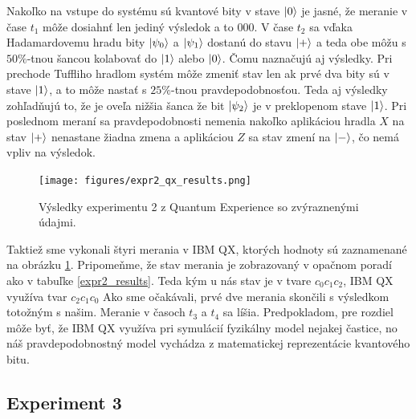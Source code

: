 Nakoľko na vstupe do systému sú kvantové bity v stave \(\ket{0}\) je jasné, že
meranie v čase \(t_1\) môže dosiahnť len jediný výsledok a to  \(000\).
V čase \(t_2\) sa vďaka Hadamardovemu hradu bity \(\ket{\psi_0}\) a 
\(\ket{\psi_1}\) dostanú do stavu \(\ket{+}\) a teda obe môžu s \(50\%\)-tnou
šancou kolabovať do \(\ket{1}\) alebo \(\ket{0}\). Čomu naznačujú aj výsledky.
Pri prechode Tuffliho hradlom systém môže zmeniť stav len ak prvé dva bity sú 
v stave \(\ket{1}\), a to môže nastať s \(25\%\)-tnou pravdepodobnosťou. Teda
aj výsledky zohľadňujú to, že je oveľa nižšia šanca že bit \(\ket{\psi_2}\)
je v preklopenom stave \(\ket{1}\). Pri poslednom meraní sa pravdepodobnosti
nemenia nakoľko aplikáciou hradla \(X\) na stav \(\ket{+}\) nenastane žiadna
zmena a aplikáciou \(Z\) sa stav zmení na \(\ket{-}\), čo nemá vpliv na
výsledok.

\begin{figure} 
	\centering 
	\texttt{[image: figures/expr2\_qx\_results.png]} 
	\caption{Výsledky experimentu 2 z Quantum Experience so zvýraznenými 
údajmi.}

    \label{expr2_qx_results}
\end{figure}

Taktiež sme vykonali štyri merania v IBM QX, ktorých hodnoty sú zaznamenané
na obrázku \ref{expr2_qx_results}. Pripomeňme, že stav merania je zobrazovaný
v opačnom poradí ako v tabuľke \ref{expr2_results}. Teda kým u nás stav je 
v tvare \(c_0c_1c_2\), IBM QX využíva tvar \(c_2c_1c_0\) Ako sme očakávali, 
prvé dve merania skončili s výsledkom totožným s našim. Meranie v časoch 
\(t_3\) a \(t_4\) sa líšia. Predpokladom, pre rozdiel môže byť, že IBM QX 
využíva pri symulácií fyzikálny model nejakej častice, no náš pravdepodobnostný
model vychádza z matematickej reprezentácie kvantového bitu.

\subsection{Experiment 3}
